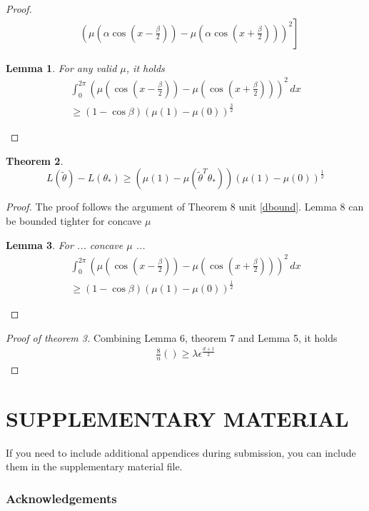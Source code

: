 \documentclass[twoside]{article} \usepackage{aistats2017}
\newtheorem{theorem}{Theorem}
\newtheorem{lemma}[theorem]{Lemma}
\begin{document}
\begin{proof}
\begin{align}
    &\left.\left(\mu(\alpha\cos(x-\frac{\beta}{2}))-\mu(\alpha \cos(x+\frac{\beta}{2}))\right)^2\right]\label{dbound}
    \end{align}
    \begin{lemma}
        For any valid $\mu$, it holds
        \begin{align*}
            \int_{0}^{2\pi}\left(\mu(\cos(x-\frac{\beta}{2}))-\mu( \cos(x+\frac{\beta}{2}))\right)^2\, dx\\
            \geq (1-\cos{\beta})(\mu(1)-\mu(0))^\frac{3}{2}
        \end{align*}
    \end{lemma}
\end{proof}
\begin{theorem}
$$L(\tilde{\theta})-L(\theta_*) \geq (\mu(1)-\mu(\tilde{\theta}^T\theta_*) )(\mu(1)-\mu(0))^{\frac{1}{2}}$$
\end{theorem}
\begin{proof}
The proof follows the argument of Theorem 8 unit \ref{dbound}. Lemma 8 can be bounded tighter for concave $\mu$
\begin{lemma}
    For ... concave $\mu$ ...
\begin{align*}
            \int_{0}^{2\pi}\left(\mu(\cos(x-\frac{\beta}{2}))-\mu( \cos(x+\frac{\beta}{2}))\right)^2\, dx\\
            \geq (1-\cos{\beta})(\mu(1)-\mu(0))^\frac{1}{2}
\end{align*}
\end{lemma}
\end{proof}
\begin{proof}[Proof of theorem 3]
 Combining Lemma 6, theorem 7 and Lemma 5, it holds
 \begin{align*}
     \frac{8}{n}() \geq \lambda \epsilon^{\frac{d+1}{2}}
 \end{align*}
\end{proof}
\section{SUPPLEMENTARY MATERIAL}

If you need to include additional appendices during submission, you
can include them in the supplementary material file.


\newpage



\subsubsection*{Acknowledgements}
\end{document}
